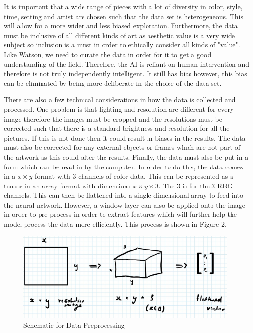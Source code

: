 \documentclass{article}
\begin{document}
It is important that a wide range of pieces with a lot of diversity in color, style, time, setting and artist are chosen such that the data set is heterogeneous. This will allow for a more wider and less biased exploration. Furthermore, the data must be inclusive of all different kinds of art as aesthetic value is a very wide subject so inclusion is a must in order to ethically consider all kinds of "value". Like Watson, we need to curate the data in order for it to get a good understanding of the field. Therefore, the AI is reliant on human intervention and therefore is not truly independently intelligent. It still has bias however, this bias can be eliminated by being more deliberate in the choice of the data set. \newline


There are also a few technical considerations in how the data is collected and processed. One problem is that lighting and resolution are different for every image therefore the images must be cropped and the resolutions must be corrected such that there is a standard brightness and resolution for all the pictures. If this is not done then it could result in biases in the results. The data must also be corrected for any external objects or frames which are not part of the artwork as this could alter the results. Finally, the data must also be put in a form which can be read in by the computer. In order to do this, the data comes in a $x \times y$ format with 3 channels of color data. This can be represented as a tensor in an array format with dimensions $x \times y \times 3$. The 3 is for the 3 RBG channels. This can then be flattened into a single dimensional array to feed into the neural network. However, a window layer can also be applied onto the image in order to pre process in order to extract features which will further help the model process the data more efficiently. This process is shown in Figure 2.

\begin{figure}[htp]
    \centering
    \includegraphics[width=11cm]{preprocessing.jpg}
    \caption{Schematic for Data Preprocessing}
    \label{fig:data}
\end{figure}
\end{document}
